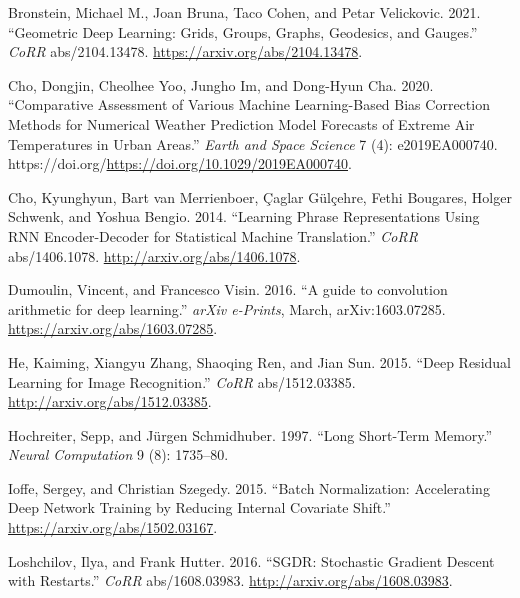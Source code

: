 \documentclass[
  letterpaper,
]{krantz}
\newlength{\cslhangindent}
\newlength{\cslentryspacingunit} %
\newenvironment{CSLReferences}[2] %
 {%
  \setlength{\parindent}{0pt}
  \ifodd #1
  \let\oldpar\par
  \def\par{\hangindent=\cslhangindent\oldpar}
  \fi
  \setlength{\parskip}{#2\cslentryspacingunit}
 }%
 {}
\begin{document}
\hypertarget{refs}{}
\begin{CSLReferences}{1}{0}
\leavevmode{}%
Bronstein, Michael M., Joan Bruna, Taco Cohen, and Petar Velickovic.
2021. {``Geometric Deep Learning: Grids, Groups, Graphs, Geodesics, and
Gauges.''} \emph{CoRR} abs/2104.13478.
\url{https://arxiv.org/abs/2104.13478}.

\leavevmode{}%
Cho, Dongjin, Cheolhee Yoo, Jungho Im, and Dong-Hyun Cha. 2020.
{``Comparative Assessment of Various Machine Learning-Based Bias
Correction Methods for Numerical Weather Prediction Model Forecasts of
Extreme Air Temperatures in Urban Areas.''} \emph{Earth and Space
Science} 7 (4): e2019EA000740.
https://doi.org/\url{https://doi.org/10.1029/2019EA000740}.

\leavevmode{}%
Cho, Kyunghyun, Bart van Merrienboer, Çaglar Gülçehre, Fethi Bougares,
Holger Schwenk, and Yoshua Bengio. 2014. {``Learning Phrase
Representations Using {RNN} Encoder-Decoder for Statistical Machine
Translation.''} \emph{CoRR} abs/1406.1078.
\url{http://arxiv.org/abs/1406.1078}.

\leavevmode{}%
Dumoulin, Vincent, and Francesco Visin. 2016. {``{A guide to convolution
arithmetic for deep learning}.''} \emph{arXiv e-Prints}, March,
arXiv:1603.07285. \url{https://arxiv.org/abs/1603.07285}.

\leavevmode{}%
He, Kaiming, Xiangyu Zhang, Shaoqing Ren, and Jian Sun. 2015. {``Deep
Residual Learning for Image Recognition.''} \emph{CoRR} abs/1512.03385.
\url{http://arxiv.org/abs/1512.03385}.

\leavevmode{}%
Hochreiter, Sepp, and Jürgen Schmidhuber. 1997. {``Long Short-Term
Memory.''} \emph{Neural Computation} 9 (8): 1735--80.

\leavevmode{}%
Ioffe, Sergey, and Christian Szegedy. 2015. {``Batch Normalization:
Accelerating Deep Network Training by Reducing Internal Covariate
Shift.''} \url{https://arxiv.org/abs/1502.03167}.

\leavevmode{}%
Loshchilov, Ilya, and Frank Hutter. 2016. {``{SGDR:} Stochastic Gradient
Descent with Restarts.''} \emph{CoRR} abs/1608.03983.
\url{http://arxiv.org/abs/1608.03983}.


\end{CSLReferences}
\end{document}
